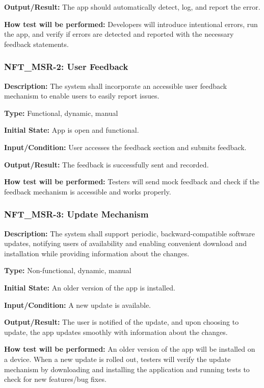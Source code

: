 \documentclass[12pt, titlepage]{article}
\begin{document}
\textbf{Output/Result: }The app should automatically detect, log, and report the error.

\textbf{How test will be performed:} Developers will introduce intentional errors, run the app, and verify if errors are detected and reported with the necessary feedback statements. 


\subsubsection*{\textbf{NFT\_MSR-2: User Feedback}
}

\textbf{Description: }The system shall incorporate an accessible user feedback mechanism to enable users to easily report issues.

\textbf{Type:} Functional, dynamic, manual

\textbf{Initial State: }App is open and functional.

\textbf{Input/Condition:} User accesses the feedback section and submits feedback.

\textbf{Output/Result:} The feedback is successfully sent and recorded.

\textbf{How test will be performed: }Testers will send mock feedback and check if the feedback mechanism is accessible and works properly.


\subsubsection*{\textbf{NFT\_MSR-3: Update Mechanism}
}

\textbf{Description: }The system shall support periodic, backward-compatible software updates, notifying users of availability and enabling convenient download and installation while providing information about the changes.

\textbf{Type:} Non-functional, dynamic, manual

\textbf{Initial State:} An older version of the app is installed.

\textbf{Input/Condition:} A new update is available.

\textbf{Output/Result:} The user is notified of the update, and upon choosing to update, the app updates smoothly with information about the changes.

\textbf{How test will be performed:} An older version of the app will be installed on a device. When a new update is rolled out, testers will verify the update mechanism by downloading and installing the application and running tests to check for new features/bug fixes. 
\newline
\end{document}
